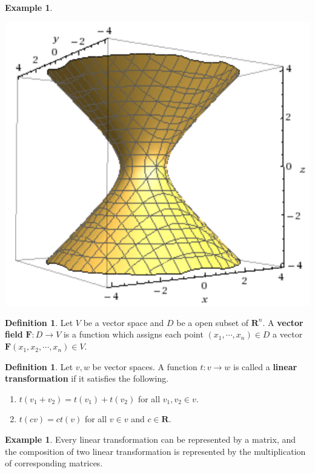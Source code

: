 \documentclass[t]{beamer}
\theoremstyle{plain}
\theoremstyle{definition}
\newtheorem{defn}[thm]{Definition}
\newtheorem{exmp}[thm]{Example}
\begin{document}
\begin{frame}
\begin{exmp}
\begin{center}
	\includegraphics[scale=.13]{image/week-02-03}
	\end{center}
\end{exmp}
\end{frame}

\begin{frame}
\begin{defn}
	Let $V$ be a vector space and 
	$D$ be a open subset of $\mathbf R^n$.
	A \textbf{vector field} $\mathbf F:D\to V$ 
	is a function which assigns each point 
	$(x_1,\cdots,x_n)\in D$ a vector
	$\mathbf F(x_1,x_2,\cdots,x_n) \in V$.
\end{defn}
\begin{defn}
	Let $v,w$ be vector spaces. 
	A function $t:v\to w$ is called a 
	\textbf{linear transformation} 
	if it satisfies the following.
	\begin{enumerate}
		\item $t(v_1+v_2)=t(v_1)+t(v_2)$ 
		for all $v_1,v_2\in v$.
		\item $t(cv)= ct(v)$ for all $v\in v$ 
		and $c\in\mathbf R$.
	\end{enumerate}
\end{defn}
\begin{exmp}
	Every linear transformation can be represented by
	a matrix, and the composition of two linear
	transformation is represented by the multiplication
	of corresponding matrices.
\end{exmp}
\end{frame}
\end{document}
